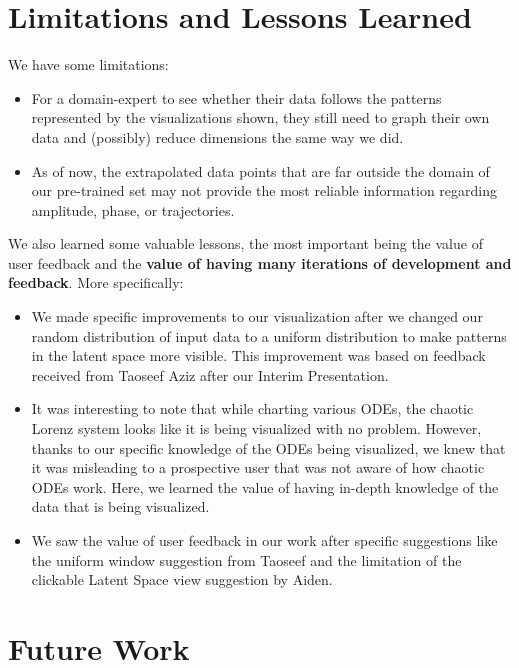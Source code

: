 \documentclass{article}
\begin{document}
\section{Limitations and Lessons Learned}

We have some limitations: 
\begin{itemize}

\item For a domain-expert to see whether their data follows the patterns represented by the visualizations shown, they still need to graph their own data and (possibly) reduce dimensions the same way we did. 

\item As of now, the extrapolated data points that are far outside the domain of our pre-trained set may not provide the most reliable information regarding amplitude, phase, or trajectories.

\end{itemize}

We also learned some valuable lessons, the most important being the value of user feedback and the \textbf{value of having many iterations of development and feedback}. More specifically:
\begin{itemize}
\item We made specific improvements to our visualization after we changed our random distribution of input data to a uniform distribution to make patterns in the latent space more visible. This improvement was based on feedback received from Taoseef Aziz after our Interim Presentation.

\item It was interesting to note that while charting various ODEs, the chaotic Lorenz system looks like it is being visualized with no problem. However, thanks to our specific knowledge of the ODEs being visualized, we knew that it was misleading to a prospective user that was not aware of how chaotic ODEs work. Here, we learned the value of having in-depth knowledge of the data that is being visualized.

\item We saw the value of user feedback in our work after specific suggestions like the uniform window suggestion from Taoseef and the limitation of the clickable Latent Space view suggestion by Aiden.

\end{itemize}

\section{Future Work}
\end{document}
